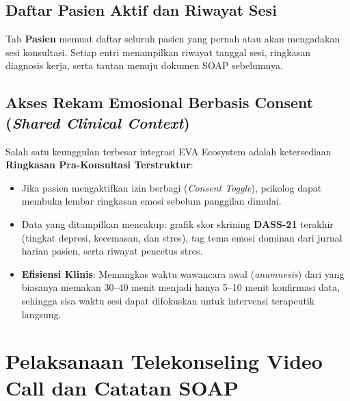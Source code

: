 \subsection{Daftar Pasien Aktif dan Riwayat Sesi}
Tab \textbf{Pasien} memuat daftar seluruh pasien yang pernah atau akan mengadakan sesi konsultasi. Setiap entri menampilkan riwayat tanggal sesi, ringkasan diagnosis kerja, serta tautan menuju dokumen SOAP sebelumnya.

\subsection{Akses Rekam Emosional Berbasis Consent (\textit{Shared Clinical Context})}
Salah satu keunggulan terbesar integrasi EVA Ecosystem adalah ketersediaan \textbf{Ringkasan Pra-Konsultasi Terstruktur}:
\begin{itemize}[leftmargin=1.4em]
  \item Jika pasien mengaktifkan izin berbagi (\textit{Consent Toggle}), psikolog dapat membuka lembar ringkasan emosi sebelum panggilan dimulai.
  \item Data yang ditampilkan mencakup: grafik skor skrining \textbf{DASS-21} terakhir (tingkat depresi, kecemasan, dan stres), tag tema emosi dominan dari jurnal harian pasien, serta riwayat pencetus stres.
  \item \textbf{Efisiensi Klinis}: Memangkas waktu wawancara awal (\textit{anamnesis}) dari yang biasanya memakan 30--40 menit menjadi hanya 5--10 menit konfirmasi data, sehingga sisa waktu sesi dapat difokuskan untuk intervensi terapeutik langsung.
\end{itemize}



\section{Pelaksanaan Telekonseling Video Call dan Catatan SOAP}

